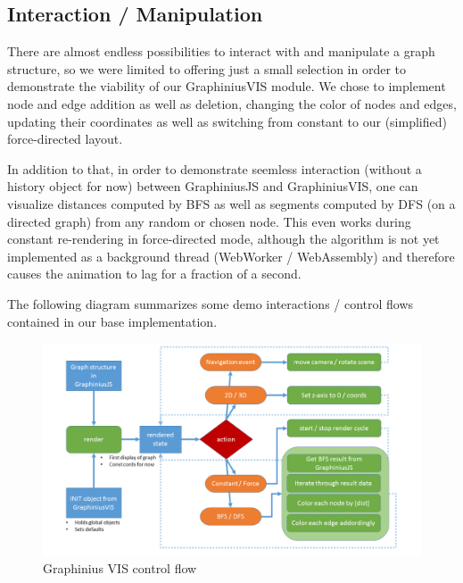 	\subsection{Interaction / Manipulation}
	\label{ssect:vis_interact_manipulate}
	
	There are almost endless possibilities to interact with and manipulate a graph structure, so we were limited to offering just a small selection in order to demonstrate the viability of our GraphiniusVIS module. We chose to implement node and edge addition as well as deletion, changing the color of nodes and edges, updating their coordinates as well as switching from constant to our (simplified) force-directed layout. 
	
	In addition to that, in order to demonstrate seemless interaction (without a history object for now) between GraphiniusJS and GraphiniusVIS, one can visualize distances computed by BFS as well as segments computed by DFS (on a directed graph) from any random or chosen node. This even works during constant re-rendering in force-directed mode, although the algorithm is not yet implemented as a background thread (WebWorker / WebAssembly) and therefore causes the animation to lag for a fraction of a second.
	
	The following diagram summarizes some demo interactions / control flows contained in our base implementation.
	
		\begin{figure}[ht]
			\hspace*{-1.3cm}
			\includegraphics[width=1.2\textwidth]{figures/VIS_Control_Flow}
			\caption{Graphinius VIS control flow}
			\label{fig_vis_control_flow}
		\end{figure}


